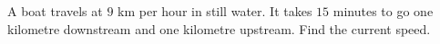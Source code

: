 A boat travels at $9$ km per hour in still water. It takes $15$ minutes to go one kilometre downstream and one kilometre upstream. Find the current speed.
